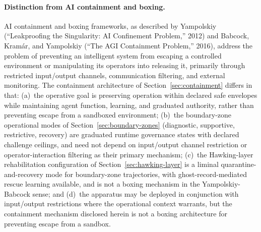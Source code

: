 \documentclass[a4paper,12pt]{article}
\begin{document}
\paragraph{Distinction from AI containment and boxing.}
AI containment and boxing frameworks, as described by Yampolskiy
(``Leakproofing the Singularity: AI Confinement Problem,''
2012) and Babcock, Kram\'ar, and Yampolskiy (``The AGI
Containment Problem,'' 2016), address the problem of preventing
an intelligent system from escaping a controlled environment or
manipulating its operators into releasing it, primarily through
restricted input/output channels, communication filtering, and
external monitoring. The containment architecture of
Section~\ref{sec:containment} differs in that: (a)~the operative
goal is preserving operation within declared safe envelopes
while maintaining agent function, learning, and graduated
authority, rather than preventing escape from a sandboxed
environment; (b)~the boundary-zone operational modes of
Section~\ref{sec:boundary-zones} (diagnostic, supportive,
restrictive, recovery) are graduated runtime governance states
with declared challenge ceilings, and need not depend on
input/output channel restriction or operator-interaction
filtering as their primary mechanism; (c)~the Hawking-layer
rehabilitation configuration of
Section~\ref{sec:hawking-layer} is a liminal
quarantine-and-recovery mode for boundary-zone trajectories,
with ghost-record-mediated rescue learning available, and is
not a boxing mechanism in the Yampolskiy-Babcock sense; and
(d)~the apparatus may be deployed in conjunction with
input/output restrictions where the operational context
warrants, but the containment mechanism disclosed herein is
not a boxing architecture for preventing escape from a sandbox.
\end{document}
